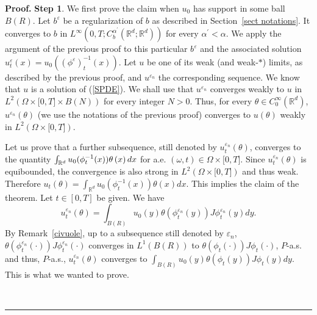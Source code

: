 \documentclass[a4paper,11pt]{article}
\newenvironment{proof}[1][Proof]{\textbf{#1.} }{\ \rule{0.5em}{0.5em}}
\begin{document}
\begin{proof}
\textbf{Step 1}. We first prove the claim when $u_{0}$ has support in some
ball $B\left( R\right) $. Let $b^{\varepsilon }$ be a regularization of $b$
as described in Section~\ref{sect notations}. It converges to $b$ in $%
L^{\infty }\left( 0,T;C_{b}^{\alpha ^{\prime }}({\mathbb{R}}^{d};{\mathbb{R}}%
^{d})\right) $ for every $\alpha ^{\prime }<\alpha $. We apply the argument
of the previous proof to this particular $b^{\varepsilon }$ and the
associated solution $u_{t}^{\varepsilon }(x)=u_{0}((\phi ^{\varepsilon
})_{t}^{-1}(x))$. Let $u$ be one of its weak (and weak-$*$) limits, as
described by the previous proof, and $u^{\varepsilon _{n}}$ the
corresponding sequence. We know that $u$ is a solution of (\ref{SPDE}). We
shall use that $u^{\varepsilon _{n}}$ converges weakly to $u$ in $%
L^{2}(\Omega \times \lbrack 0,T]\times B\left( N\right) )$ for every integer
$N>0$. Thus, for every $\theta \in C_{0}^{\infty }(\mathbb{R}^{d})$, $%
u^{\varepsilon _{n}}\left( \theta \right) $ (we use the notations of the
previous proof) converges to $u\left( \theta \right) $ weakly in $%
L^{2}(\Omega \times \lbrack 0,T])$.

Let us prove that a further subsequence, still denoted by $%
u_{t}^{\varepsilon _{n}}\left( \theta \right) $, converges to the quantity $\int_{{%
\mathbb{R}}^{d}}u_{0}(\phi _{t}^{-1}(x))\theta \left( x\right) dx$ for a.e. $%
\left( \omega ,t\right) \in \Omega \times \lbrack 0,T]$. Since $%
u_{t}^{\varepsilon _{n}}\left( \theta \right) $ is equibounded, the
convergence is also strong in $L^{2}(\Omega \times \lbrack 0,T])$ and thus
weak. Therefore $u_t\left( \theta \right) =\int_{{\mathbb{R}}^{d}}u_{0}(\phi
_{t}^{-1}(x))\theta \left( x\right) dx$. This implies the claim of the
theorem. Let $t\in \left[ 0,T\right] $ be given. We have
\begin{equation*}
u_{t}^{\varepsilon _{n}}\left( \theta \right) =\int_{B\left( R\right)
}u_{0}(y)\theta \left( \phi _{t}^{\varepsilon _{n}}\left( y\right) \right)
J\phi _{t}^{\varepsilon _{n}}(y)dy.
\end{equation*}
By Remark~\ref{civuole}, up to a subsequence still denoted by $\varepsilon
_{n}$, $\theta \left( \phi _{t}^{\varepsilon _{n}}\left( \cdot \right)
\right) J\phi _{t}^{\varepsilon _{n}}(\cdot )$ converges in $L^{1}\left(
B\left( R\right) \right) $ to $\theta \left( \phi _{t}\left( \cdot \right)
\right) J\phi _{t}(\cdot )$, $P$-a.s. and thus, $P$-a.s., $%
u_{t}^{\varepsilon _{n}}\left( \theta \right) $ converges to $\int_{B\left(
R\right) }u_{0}(y)\theta \left( \phi _{t}\left( y\right) \right) J\phi
_{t}(y)dy$. This is what we wanted to prove.


\end{proof}
\end{document}
